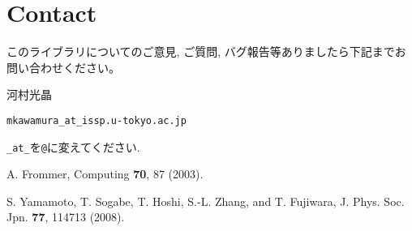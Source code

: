 \documentclass[12pt,titlepage]{jarticle}
\begin{document}
\section{Contact}

このライブラリについてのご意見, ご質問, バグ報告等ありましたら下記までお問い合わせください。

河村光晶

\begin{verbatim}
mkawamura_at_issp.u-tokyo.ac.jp
\end{verbatim}
\verb|_at_|を\verb|@|に変えてください.

\begin{thebibliography}{99}
  A. Frommer, Computing {\bf 70}, 87 (2003).
  
  S. Yamamoto, T. Sogabe, T. Hoshi, S.-L. Zhang, and T. Fujiwara, J. Phys. Soc. Jpn. {\bf 77}, 114713 (2008).
\end{thebibliography}
\end{document}
